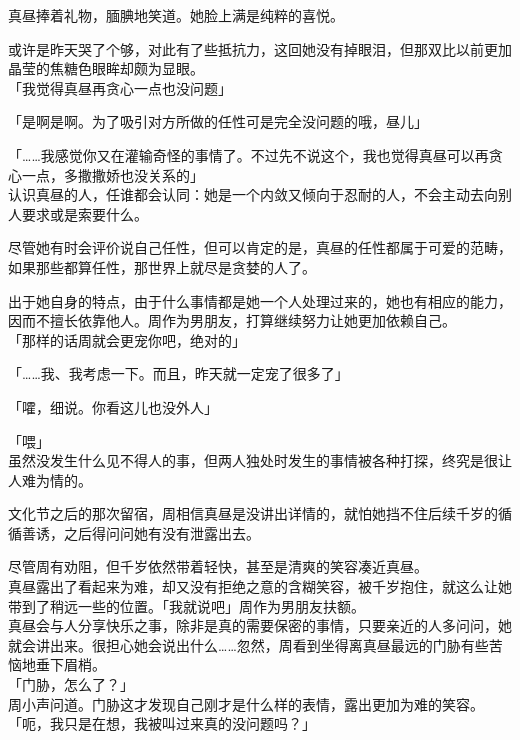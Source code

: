 真昼捧着礼物，腼腆地笑道。她脸上满是纯粹的喜悦。

或许是昨天哭了个够，对此有了些抵抗力，这回她没有掉眼泪，但那双比以前更加晶莹的焦糖色眼眸却颇为显眼。\\

「我觉得真昼再贪心一点也没问题」

「是啊是啊。为了吸引对方所做的任性可是完全没问题的哦，昼儿」

「……我感觉你又在灌输奇怪的事情了。不过先不说这个，我也觉得真昼可以再贪心一点，多撒撒娇也没关系的」\\

认识真昼的人，任谁都会认同：她是一个内敛又倾向于忍耐的人，不会主动去向别人要求或是索要什么。

尽管她有时会评价说自己任性，但可以肯定的是，真昼的任性都属于可爱的范畴，如果那些都算任性，那世界上就尽是贪婪的人了。

出于她自身的特点，由于什么事情都是她一个人处理过来的，她也有相应的能力，因而不擅长依靠他人。周作为男朋友，打算继续努力让她更加依赖自己。\\

「那样的话周就会更宠你吧，绝对的」

「……我、我考虑一下。而且，昨天就一定宠了很多了」

「嚯，细说。你看这儿也没外人」

「喂」\\

虽然没发生什么见不得人的事，但两人独处时发生的事情被各种打探，终究是很让人难为情的。

文化节之后的那次留宿，周相信真昼是没讲出详情的，就怕她挡不住后续千岁的循循善诱，之后得问问她有没有泄露出去。

尽管周有劝阻，但千岁依然带着轻快，甚至是清爽的笑容凑近真昼。\\

真昼露出了看起来为难，却又没有拒绝之意的含糊笑容，被千岁抱住，就这么让她带到了稍远一些的位置。「我就说吧」周作为男朋友扶额。\\

真昼会与人分享快乐之事，除非是真的需要保密的事情，只要亲近的人多问问，她就会讲出来。很担心她会说出什么……忽然，周看到坐得离真昼最远的门胁有些苦恼地垂下眉梢。\\

「门胁，怎么了？」\\

周小声问道。门胁这才发现自己刚才是什么样的表情，露出更加为难的笑容。\\

「呃，我只是在想，我被叫过来真的没问题吗？」

